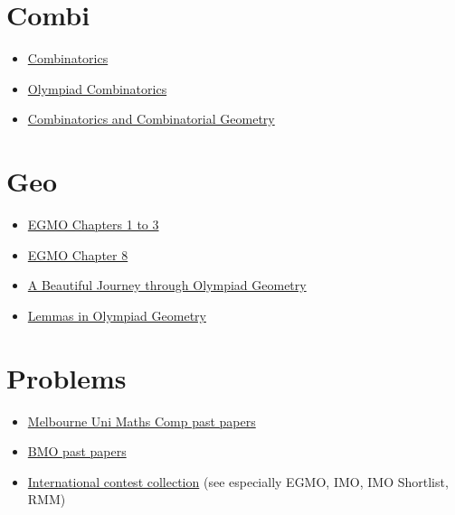\section{Combi}
\begin{itemize}
  \item \href{http://math.sun.ac.za/swagner/Combinatorics.pdf}{Combinatorics}
  \item
    \href{https://drive.google.com/file/d/1sQtirXxkEfWYuGSKDZ-d7VGYkR_idebY/view}
    {Olympiad Combinatorics}
  \item
    \href{https://drive.google.com/file/d/1pkgUjWs4ArL9Huq712NO1RtuAvXjr3d9/view?usp=sharing}
    {Combinatorics and Combinatorial Geometry}
\end{itemize}

\section{Geo}
\begin{itemize}
  \item
    \href{https://books.google.com/books?id=47UaDAAAQBAJ&lpg=PP1&pg=PP1#v=onepage&q&f=false}
    {EGMO Chapters 1 to 3}
  \item
    \href{https://www.maa.org/sites/default/files/pdf/ebooks/pdf/EGMO_chapter8.pdf}
    {EGMO Chapter 8}
  \item \href{https://www.olympiadgeometry.com/the-book.html} {A Beautiful
      Journey through Olympiad Geometry}
  \item \href{https://yufeizhao.com/olympiad/geolemmas.pdf} {Lemmas in Olympiad
      Geometry}
\end{itemize}

\section{Problems}
\begin{itemize}
  \item \href{https://mathscomp.ms.unimelb.edu.au/past-papers/} {Melbourne Uni
      Maths Comp past papers}
  \item \href{https://www.bmoc.maths.org/home/bmolot.pdf} {BMO past papers}
  \item 
    \href{https://artofproblemsolving.com/community/c14_international_contests}
    {International contest collection}
    (see especially EGMO, IMO,  IMO Shortlist, RMM)
\end{itemize}

